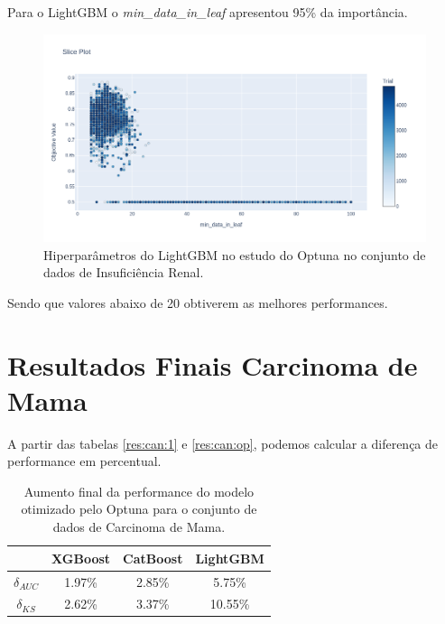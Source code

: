 Para o LightGBM o \textit{min\_data\_in\_leaf} apresentou 95\% da importância.
\begin{figure}[H]
 \caption{Hiperparâmetros do LightGBM no estudo do Optuna no conjunto de dados de Insuficiência Renal.}
 \label{fig:op:kind:min:lgbm}
 \centering
 \includegraphics[scale=0.3]{images/optuna_min_lgbm_kindey.png}
\end{figure}
Sendo que valores abaixo de 20 obtiverem as melhores performances.
\section{Resultados Finais Carcinoma de Mama}
A partir das tabelas \ref{res:can:1} e \ref{res:can:op}, podemos calcular a diferença de performance em percentual.

\begin{table}[H]
\centering
\begin{tabular}{|c|c|c|c|}
\hline
	& \textbf{XGBoost} &\textbf{CatBoost} & \textbf{LightGBM} \\
\hline
$\delta_{AUC}$	& 1.97\%&	2.85\%	   &     5.75\% \\
\hline
$\delta_{KS}$	& 2.62\%    	&  3.37\% &	10.55\%\\
\hline
\end{tabular}
\caption{Aumento final da performance do modelo otimizado pelo Optuna para o conjunto de dados de Carcinoma de Mama.}
\end{table}

